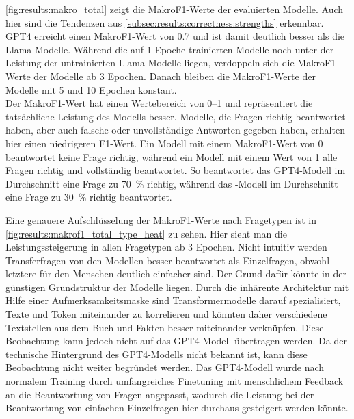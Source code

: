 \cref{fig:results:makro_total} zeigt die MakroF1-Werte der evaluierten Modelle.
Auch hier sind die Tendenzen aus \cref{subsec:results:correctness:strengths} erkennbar.
GPT4 erreicht einen MakroF1-Wert von \num{0.7} und ist damit deutlich besser als die Llama-Modelle.
Während die auf 1 Epoche trainierten Modelle noch unter der Leistung der untrainierten Llama-Modelle liegen, verdoppeln sich die MakroF1-Werte der Modelle ab 3 Epochen.
Danach bleiben die MakroF1-Werte der Modelle mit 5 und 10 Epochen konstant.\\

Der MakroF1-Wert hat einen Wertebereich von \numrange{0}{1} und repräsentiert die tatsächliche Leistung des Modells besser.
Modelle, die Fragen richtig beantwortet haben, aber auch falsche oder unvollständige Antworten gegeben haben, erhalten hier einen niedrigeren F1-Wert.
Ein Modell mit einem MakroF1-Wert von \num{0} beantwortet keine Frage richtig, während ein Modell mit einem Wert von \num{1} alle Fragen richtig und vollständig beantwortet.
So beantwortet das GPT4-Modell im Durchschnitt eine Frage zu \SI{70}{\percent} richtig, während das \lea-Modell im Durchschnitt eine Frage zu \SI{30}{\percent} richtig beantwortet.\\


Eine genauere Aufschlüsselung der MakroF1-Werte nach Fragetypen ist in \cref{fig:results:makrof1_total_type_heat} zu sehen.
Hier sieht man die Leistungssteigerung in allen Fragetypen ab 3 Epochen.
Nicht intuitiv werden Transferfragen von den Modellen besser beantwortet als Einzelfragen, obwohl letztere für den Menschen deutlich einfacher sind.
Der Grund dafür könnte in der günstigen Grundstruktur der Modelle liegen.
Durch die inhärente Architektur mit Hilfe einer Aufmerksamkeitsmaske sind Transformermodelle darauf spezialisiert, Texte und Token miteinander zu korrelieren und könnten daher verschiedene Textstellen aus dem Buch und Fakten besser miteinander verknüpfen.
Diese Beobachtung kann jedoch nicht auf das GPT4-Modell übertragen werden.
Da der technische Hintergrund des GPT4-Modells nicht bekannt ist, kann diese Beobachtung nicht weiter begründet werden.
Das GPT4-Modell wurde nach normalem Training durch umfangreiches Finetuning mit menschlichem Feedback an die Beantwortung von Fragen angepasst, wodurch die Leistung bei der Beantwortung von einfachen Einzelfragen hier durchaus gesteigert werden könnte.\\


